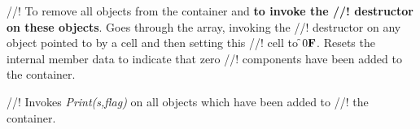 //! To remove all objects from the container and {\bf to invoke the
//! destructor on these objects}. Goes through the array, invoking the
//! destructor on any object pointed to by a cell and then setting this
//! cell to \f$0{\bf F}$. Resets the internal member data to indicate that zero
//! components have been added to the container.

//! Invokes {\em Print(s,flag)} on all objects which have been added to
//! the container. 






